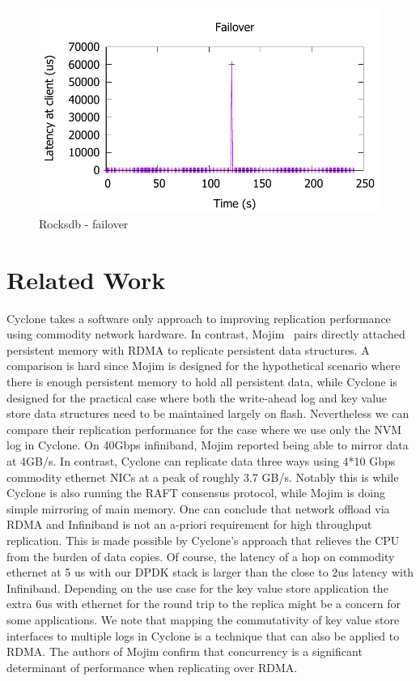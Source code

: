 \documentclass[pageno]{jpaper}
\begin{document}
\begin{figure}
\includegraphics[scale=0.6]{results2/failover.pdf}
\caption{Rocksdb - failover}
\label{fig:timeline}
\end{figure}

\section{Related Work}

Cyclone takes a software only approach to improving replication performance
using commodity network hardware. In contrast, Mojim~\cite{mojim} pairs directly
attached persistent memory with RDMA to replicate persistent data structures. A
comparison is hard since Mojim is designed for the hypothetical scenario where
there is enough persistent memory to hold all persistent data, while Cyclone is
designed for the practical case where both the write-ahead log and key value
store data structures need to be maintained largely on flash. Nevertheless we
can compare their replication performance for the case where we use only the NVM
log in Cyclone. On 40Gbps infiniband, Mojim reported being able to mirror data
at 4GB/s. In contrast, Cyclone can replicate data three ways using 4*10 Gbps
commodity ethernet NICs at a peak of roughly 3.7 GB/s. Notably this is while
Cyclone is also running the RAFT consensus protocol, while Mojim is doing simple
mirroring of main memory. One can conclude that network offload via RDMA and
Infiniband is not an a-priori requirement for high throughput replication. This
is made possible by Cyclone's approach that relieves the CPU from the burden of
data copies. Of course, the latency of a hop on commodity ethernet at 5 us with
our DPDK stack is larger than the close to 2us latency with
Infiniband. Depending on the use case for the key value store application the
extra 6us with ethernet for the round trip to the replica might be a concern for
some applications. We note that mapping the commutativity of key value store
interfaces to multiple logs in Cyclone is a technique that can also be applied
to RDMA. The authors of Mojim confirm that concurrency is a significant
determinant of performance when replicating over RDMA.
\end{document}
